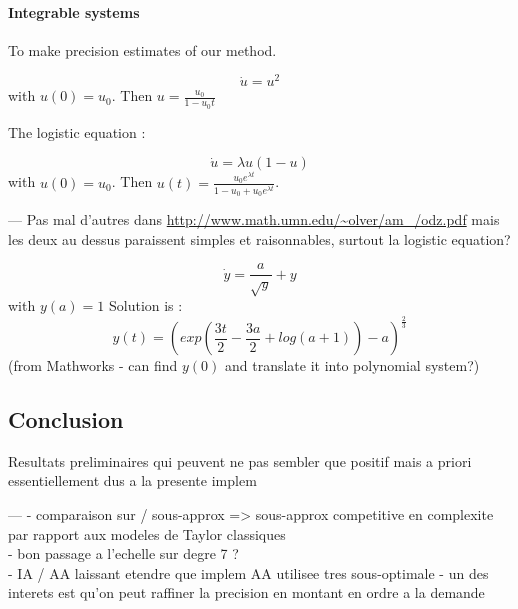 \documentclass{sig-alternate-05-2015} %
\newcommand\ForAuthors[1]%
 {\par\smallskip                     %
  \begin{center}%
   \fbox%
   {\parbox{0.9\linewidth}%
    {\raggedright\sc--- #1}%
   }%
  \end{center}%
  \par\smallskip                     %
 }
\begin{document}
\paragraph{Integrable systems}
To make precision estimates of our method. 

$$\dot{u}=u^2$$
\noindent with $u(0)=u_0$. 
Then $u=\frac{u_0}{1-u_0t}$

The logistic equation :

$$\dot{u}=\lambda u(1-u)$$
\noindent with $u(0)=u_0$. Then
$u(t)=\frac{u_0e^{\lambda t}}{1-u_0+u_0e^{\lambda t}}$.

\ForAuthors{Pas mal d'autres dans \url{http://www.math.umn.edu/~olver/am_/odz.pdf} mais les deux au dessus paraissent simples et raisonnables, surtout la 
logistic equation?}

$$\dot{y} = \frac{a}{\sqrt{y}}+y$$
\noindent with $y(a)=1$
Solution is :
$$y(t)=\left(exp\left(\frac{3t}{2} - \frac{3a}{2} + log(a + 1)\right) - a\right)^{\frac{2}{3}}$$
(from Mathworks - can find $y(0)$ and translate it into polynomial system?)

\subsection{Conclusion}
Resultats preliminaires qui peuvent ne pas sembler que positif mais a priori essentiellement dus a la presente implem
\ForAuthors{
- comparaison sur / sous-approx => sous-approx competitive en complexite par rapport aux modeles de Taylor classiques\\
- bon passage a l'echelle sur degre 7 ? \\
- IA / AA laissant etendre que implem AA utilisee tres sous-optimale
- un des interets est qu'on peut raffiner la precision en montant en ordre a la demande
}


\end{document}
